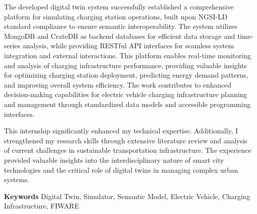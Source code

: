 \documentclass[11pt]{memoir}
\begin{document}
The developed digital twin system successfully established a comprehensive platform for simulating charging station operations, built upon NGSI-LD standard compliance to ensure semantic interoperability. The system utilizes MongoDB and CrateDB as backend databases for efficient data storage and time-series analysis, while providing RESTful API interfaces for seamless system integration and external interactions. This platform enables real-time monitoring and analysis of charging infrastructure performance, providing valuable insights for optimizing charging station deployment, predicting energy demand patterns, and improving overall system efficiency. The work contributes to enhanced decision-making capabilities for electric vehicle charging infrastructure planning and management through standardized data models and accessible programming interfaces.

This internship significantly enhanced my technical expertise. Additionally, I strengthened my research skills through extensive literature review and analysis of current challenges in sustainable transportation infrastructure. The experience provided valuable insights into the interdisciplinary nature of smart city technologies and the critical role of digital twins in managing complex urban systems.

\bigskip\bigskip

\textbf{\color{CentraleBlue}Keywords} Digital Twin, Simulator, Semantic Model, Electric Vehicle, Charging Infrastructure, FIWARE

\newpage

\restoregeometry 

\tableofcontents





\printglossaries


\appendix






 

\end{document}
